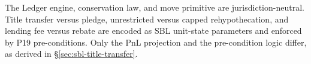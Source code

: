 \noindent The Ledger engine, conservation law, and move primitive are jurisdiction-neutral. Title transfer versus pledge, unrestricted versus capped rehypothecation, and lending fee versus rebate are encoded as SBL unit-state parameters and enforced by P19 pre-conditions. Only the PnL projection and the pre-condition logic differ, as derived in \S\ref{sec:sbl-title-transfer}.


